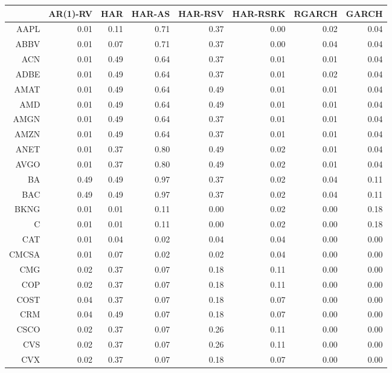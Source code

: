 \begin{table}[ht]
\centering
\begin{tabular}{rrrrrrrr}
  \hline
 & AR(1)-RV & HAR & HAR-AS & HAR-RSV & HAR-RSRK & RGARCH & GARCH \\ 
  \hline
AAPL & 0.01 & 0.11 & 0.71 & 0.37 & 0.00 & 0.02 & 0.04 \\ 
  ABBV & 0.01 & 0.07 & 0.71 & 0.37 & 0.00 & 0.04 & 0.04 \\ 
  ACN & 0.01 & 0.49 & 0.64 & 0.37 & 0.01 & 0.01 & 0.04 \\ 
  ADBE & 0.01 & 0.49 & 0.64 & 0.37 & 0.01 & 0.02 & 0.04 \\ 
  AMAT & 0.01 & 0.49 & 0.64 & 0.49 & 0.01 & 0.01 & 0.04 \\ 
  AMD & 0.01 & 0.49 & 0.64 & 0.49 & 0.01 & 0.01 & 0.04 \\ 
  AMGN & 0.01 & 0.49 & 0.64 & 0.37 & 0.01 & 0.01 & 0.04 \\ 
  AMZN & 0.01 & 0.49 & 0.64 & 0.37 & 0.01 & 0.01 & 0.04 \\ 
  ANET & 0.01 & 0.37 & 0.80 & 0.49 & 0.02 & 0.01 & 0.04 \\ 
  AVGO & 0.01 & 0.37 & 0.80 & 0.49 & 0.02 & 0.01 & 0.04 \\ 
  BA & 0.49 & 0.49 & 0.97 & 0.37 & 0.02 & 0.04 & 0.11 \\ 
  BAC & 0.49 & 0.49 & 0.97 & 0.37 & 0.02 & 0.04 & 0.11 \\ 
  BKNG & 0.01 & 0.01 & 0.11 & 0.00 & 0.02 & 0.00 & 0.18 \\ 
  C & 0.01 & 0.01 & 0.11 & 0.00 & 0.02 & 0.00 & 0.18 \\ 
  CAT & 0.01 & 0.04 & 0.02 & 0.04 & 0.04 & 0.00 & 0.00 \\ 
  CMCSA & 0.01 & 0.07 & 0.02 & 0.02 & 0.04 & 0.00 & 0.00 \\ 
  CMG & 0.02 & 0.37 & 0.07 & 0.18 & 0.11 & 0.00 & 0.00 \\ 
  COP & 0.02 & 0.37 & 0.07 & 0.18 & 0.11 & 0.00 & 0.00 \\ 
  COST & 0.04 & 0.37 & 0.07 & 0.18 & 0.07 & 0.00 & 0.00 \\ 
  CRM & 0.04 & 0.49 & 0.07 & 0.18 & 0.07 & 0.00 & 0.00 \\ 
  CSCO & 0.02 & 0.37 & 0.07 & 0.26 & 0.11 & 0.00 & 0.00 \\ 
  CVS & 0.02 & 0.37 & 0.07 & 0.26 & 0.11 & 0.00 & 0.00 \\ 
  CVX & 0.02 & 0.37 & 0.07 & 0.18 & 0.07 & 0.00 & 0.00 \\ 

\end{tabular}
\end{table}
